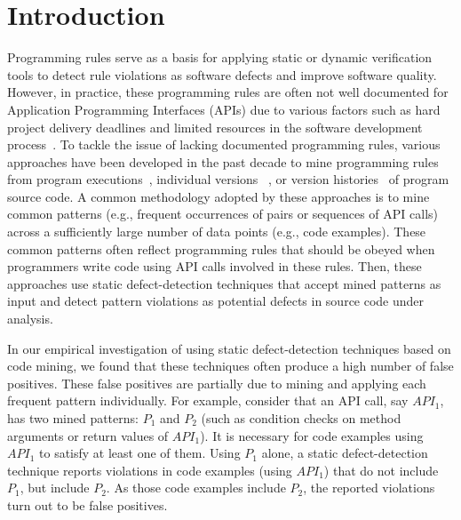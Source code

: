 \section{Introduction}
\label{sec:intro}

Programming rules serve as a basis for applying static or dynamic verification tools to detect rule violations as software defects and improve software quality. However, in practice, these programming rules are often not well documented for Application Programming Interfaces (APIs) due to various factors such as hard project delivery deadlines and limited resources in the software development process~\cite{document:leth}. To tackle the issue of lacking documented programming rules, various approaches have been developed in the past decade to mine programming rules from program executions~\cite{ernst01:dynamically,ammons02mining,yang2006pmt}, individual versions ~\cite{Engler2001deviant,Zhenmin2005PRMiner,acharya06:mining,ramanathan07:path,shoham07:static,chang07:finding,acharya07:mining,wasylkowski07:detecting}, or version histories~\cite{livshits05dynamine,Chadd2005rule} of program source code. A common methodology adopted by these approaches is to mine common patterns (e.g., frequent occurrences of pairs or sequences of API calls) across a sufficiently large number of data points (e.g., code examples). These common patterns often reflect programming rules that should be obeyed when programmers write code using API calls involved in these rules. Then, these approaches use static defect-detection techniques that accept mined patterns as input and detect pattern violations as potential defects in source code under analysis.

In our empirical investigation of using static defect-detection techniques based on code mining, we found that these techniques often produce a high number of false positives. These false positives are partially due to mining and applying each frequent pattern individually. For example, consider that an API call, say $API_1$, has two mined patterns: $P_1$ and $P_2$ (such as condition checks on method arguments or return values of $API_1$). It is necessary for code examples using $API_1$ to satisfy at least one of them. Using $P_1$ alone, a static defect-detection technique reports violations in code examples (using $API_1$) that do not include $P_1$, but include $P_2$. As those code examples include $P_2$, the reported violations turn out to be false positives.

